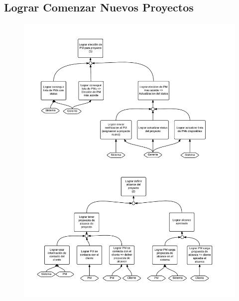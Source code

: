 \subsection{Lograr Comenzar Nuevos Proyectos}
\begin{figure}[H]
\includegraphics[width=\textwidth, clip=true, trim=15pt 0pt 15pt 0pt]{imagenes/objetivos/objetivos11.pdf}
\end{figure}
